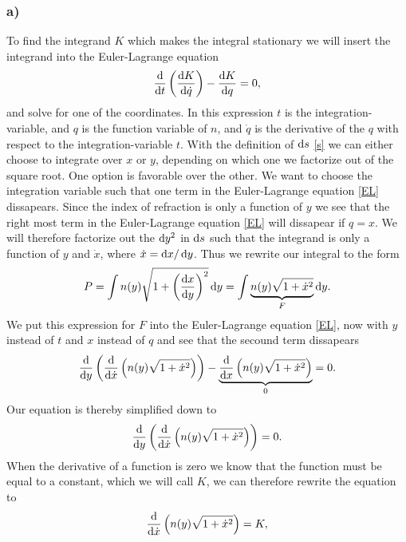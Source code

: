 \documentclass[12pt,twoside]{article}
\begin{document}
\subsubsection*{a)}
To find the integrand $K$ which makes the integral stationary we will insert the integrand into the Euler-Lagrange equation
\begin{equation}
  \dv{}{t}\left( \dv{K}{\dot{q}} \right) - \dv{K}{q} = 0, \label{EL}
\end{equation}
and solve for one of the coordinates. In this expression $t$ is the integration-variable, and $q$ is the function variable of $n$, and $\dot{q}$ is the derivative of the $q$ with respect to the integration-variable $t$. With the definition of $\dif s$ \eqref{s} we can either choose to integrate over $x$ or $y$, depending on which one we factorize out of the square root. One option is favorable over the other. We want to choose the integration variable such that one term in the Euler-Lagrange equation \eqref{EL} dissapears. Since the index of refraction is only a function of $y$ we see that the right most term in the Euler-Lagrange equation \eqref{EL} will dissapear if $q=x$. We will therefore factorize out the $\dif y^2$ in $\dif s$ such that the integrand is only a function of $y$ and $\dot{x}$, where $\dot{x}=\dif x/\dif y$.
Thus we rewrite our integral to the form
\begin{equation}
  P = \int n(y) \sqrt{1+\left(\frac{\dif x}{\dif y}\right)^2} \dif y = \int \underbrace{n(y) \sqrt{1+\dot{x}^2}}_{F} \dif y.
\end{equation}
We put this expression for $F$ into the Euler-Lagrange equation \eqref{EL}, now with $y$ instead of $t$ and $x$ instead of $q$ and see that the secound term dissapears
\begin{equation}
  \dv{}{y}\left(\dv{}{\dot{x}}\left( n(y) \sqrt{1+\dot{x}^2} \right)\right) - \underbrace{\dv{}{x}\left(n(y) \sqrt{1+\dot{x}^2}\right)}_0 = 0. \label{EL}
\end{equation}
Our equation is thereby simplified down to
\begin{equation}
  \dv{}{y}\left(\dv{}{\dot{x}}\left( n(y) \sqrt{1+\dot{x}^2} \right)\right) = 0.
\end{equation}
When the derivative of a function is zero we know that the function must be equal to a constant, which we will call $K$, we can therefore rewrite the equation to
\begin{equation}
  \dv{}{\dot{x}}\left( n(y) \sqrt{1+\dot{x}^2}\right) = K,
\end{equation}
\end{document}
